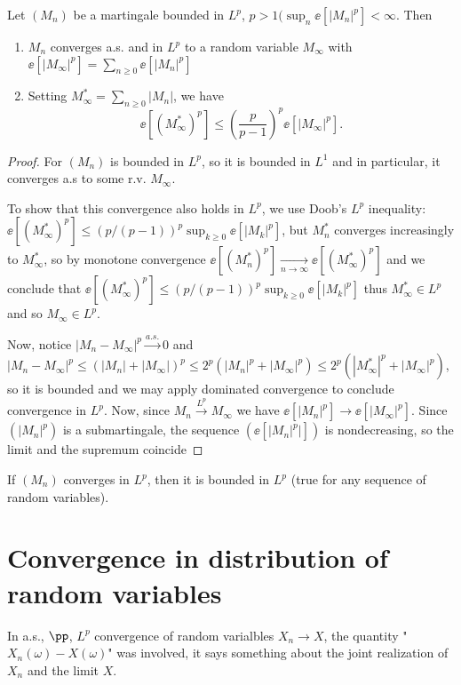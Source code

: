 \documentclass[../main.tex]{subfiles}
\begin{document}
\begin{theorem}
  [$L^p$ Martingales]
  Let $(M_n)$ be a martingale bounded in $L^p$, $p > 1 (\sup_{n} \ee[|M_n|^p]
  < \infty$. Then
  \begin{enumerate}
    \item $M_n$ converges a.s. and in $L^p$ to a random variable $M_{\infty}$
      with $\ee[|M_{\infty}|^p] = \sum_{n \geq 0}\ee[|M_n|^p]$
    \item Setting $M_{\infty}^* = \sum_{n \geq 0} |M_n|$, we have
      \[
        \ee[(M_{\infty}^*)^p] \leq \left(\frac{p}{p-1}\right)^p
        \ee[|M_{\infty}|^p] 
      .\] 
  \end{enumerate}
\end{theorem}
\begin{proof}
  For  $(M_n)$ is bounded in $L^p$, so it is bounded in $L^1$ and in
  particular, it converges a.s to some r.v. $M_\infty$. 

  To show that this
  convergence also holds in $L^p$, we use Doob's $L^p$ inequality:
  $\ee[(M_{\infty}^*)^p] \leq (p/(p-1))^p \sup_{k \geq 0} \ee[|M_k|^p]$, but 
  $M_n^*$ converges increasingly to $M_{\infty}^*$, so by monotone convergence
  $\ee[(M_n^{*})^p] \underset{n \to \infty}{\longrightarrow}
  \ee[(M_{\infty}^*)^p]$ and we conclude that $\ee[(M_{\infty}^*)^p] \leq
  (p/(p-1))^p \sup_{k \geq 0} \ee[|M_k|^p]$ thus $M_{\infty}^* \in L^p$ and so
   $M_{\infty} \in L^p$. 

   Now, notice $|M_n - M_{\infty}|^p \overset{a.s.}{\longrightarrow} 0$ and
   $|M_n - M_{\infty}|^p \leq (|M_n| + |M_{\infty}|)^p \leq 2^p (|M_n|^p +
   |M_{\infty}|^p) \leq 2^p (|M_{\infty}^*|^p +
   |M_{\infty}|^p)$, so it is bounded and we may apply dominated convergence
   to conclude convergence in $L^p$.
  Now, since $M_n \overset{L^p}{\longrightarrow} M_{\infty}$ we
   have $\ee[|M_n|^p] \to \ee[|M_{\infty}|^p]$. Since $(|M_n|^p)$ is a
   submartingale, the sequence $(\ee[|M_n|^p|])$ is nondecreasing, so the
   limit and the supremum coincide
\end{proof}
\begin{remark}
  If $(M_n)$ converges in $L^p$, then it is bounded in $L^p$ (true for any
  sequence of random variables).
\end{remark}

\section{Convergence in distribution of random variables}
In a.s., $\pp$, $L^p$ convergence of random varialbles $X_n \to X$, the
quantity "$X_n(\omega) - X(\omega)$" was involved, it says something about the
joint realization of $X_n$ and the limit $X$.
\end{document}
